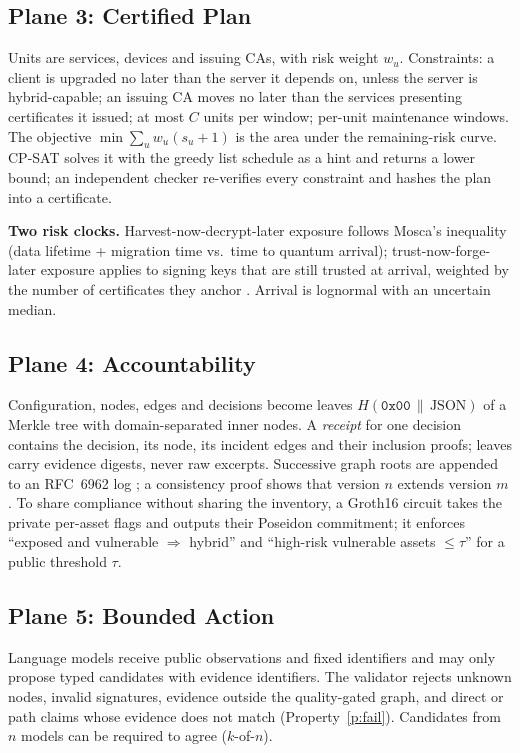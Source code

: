 \documentclass[a4paper,twoside]{article}
\begin{document}
\subsection{Plane 3: Certified Plan}
Units are services, devices and issuing CAs, with risk weight $w_u$. Constraints: a client is upgraded no later than the server it depends on, unless the server is hybrid-capable; an issuing CA moves no later than the services presenting certificates it issued; at most $C$ units per window; per-unit maintenance windows. The objective $\min \sum_u w_u (s_u+1)$ is the area under the remaining-risk curve. CP-SAT \cite{ortools} solves it with the greedy list schedule as a hint and returns a lower bound; an independent checker re-verifies every constraint and hashes the plan into a certificate.

\textbf{Two risk clocks.} Harvest-now-decrypt-later exposure follows Mosca's inequality \cite{mosca2018cybersecurity} (data lifetime + migration time vs.\ time to quantum arrival); trust-now-forge-later exposure applies to signing keys that are still trusted at arrival, weighted by the number of certificates they anchor \cite{grover2026cbom,campbell2026agentic}. Arrival is lognormal with an uncertain median.

\subsection{Plane 4: Accountability}
Configuration, nodes, edges and decisions become leaves $H(\texttt{0x00}\,\|\,\text{JSON})$ of a Merkle tree with domain-separated inner nodes. A \emph{receipt} for one decision contains the decision, its node, its incident edges and their inclusion proofs; leaves carry evidence digests, never raw excerpts. Successive graph roots are appended to an RFC~6962 log \cite{rfc6962,rfc9162}; a consistency proof shows that version $n$ extends version $m$. To share compliance without sharing the inventory, a Groth16 circuit \cite{groth16} takes the private per-asset flags and outputs their Poseidon commitment; it enforces ``exposed and vulnerable $\Rightarrow$ hybrid'' and ``high-risk vulnerable assets $\le \tau$'' for a public threshold $\tau$.

\subsection{Plane 5: Bounded Action}
Language models receive public observations and fixed identifiers and may only propose typed candidates with evidence identifiers. The validator rejects unknown nodes, invalid signatures, evidence outside the quality-gated graph, and direct or path claims whose evidence does not match (Property~\ref{p:fail}). Candidates from $n$ models can be required to agree ($k$-of-$n$). 
\end{document}
